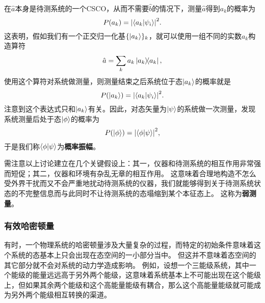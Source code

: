 \documentclass[UTF8, a4paper]{ctexart}
\begin{document}
在$\hat{a}$本身是待测系统的一个CSCO，从而不需要$\hat{b}$的情况下，测量$\hat{a}$得到$a_k$的概率为
\begin{equation}
    P(a_k) = \abs{\braket{a_k}{\psi_i}}^2.
\end{equation}
这表明，假如我们有一个正交归一化基$\{\ket{a_k}\}_k$，就可以使用一组不同的实数$a_k$构造算符
\[
    \hat{a} = \sum_k a_k \dyad{a_k},
\]
使用这个算符对系统做测量，则测量结束之后系统位于态$\ket{a_k}$的概率就是
\begin{equation}
    P(\ket{a_k}) = \abs{\braket{a_k}{\psi_i}}^2.
\end{equation}
注意到这个表达式只和$\ket{a_k}$有关。因此，对态矢量为$\ket{\psi}$的系统做一次测量，发现系统测量后处于态$\ket{\phi}$的概率为
\begin{equation}
    P(\ket{\phi}) = \abs{\braket{\phi}{\psi}}^2,
\end{equation}
于是我们称$\braket{\phi}{\psi}$为\textbf{概率振幅}。

需注意以上讨论建立在几个关键假设上：其一，仪器和待测系统的相互作用非常强而短促；其二，仪器和环境有杂乱无章的相互作用。
这意味着合理地构造不怎么受外界干扰而又不会严重地扰动待测系统的仪器，我们就能够得到关于待测系统状态的不完整信息而与此同时不让待测系统的态塌缩到某个本征态上。
这称为\textbf{弱测量}。

\subsubsection{有效哈密顿量}

有时，一个物理系统的哈密顿量涉及大量复杂的过程，而特定的初始条件意味着这个系统的态基本上只会出现在态空间的一小部分当中。
但这并不意味着态空间的其它部分就不会对系统的动力学造成影响。
例如，设想一个三能级系统，其中一个能级的能量远远高于另外两个能级，这意味着系统基本上不可能出现在这个能级上，但如果其余两个能级和这个高能量能级有耦合，那么这个高能量能级就可能成为另外两个能级相互转换的渠道。
\end{document}
